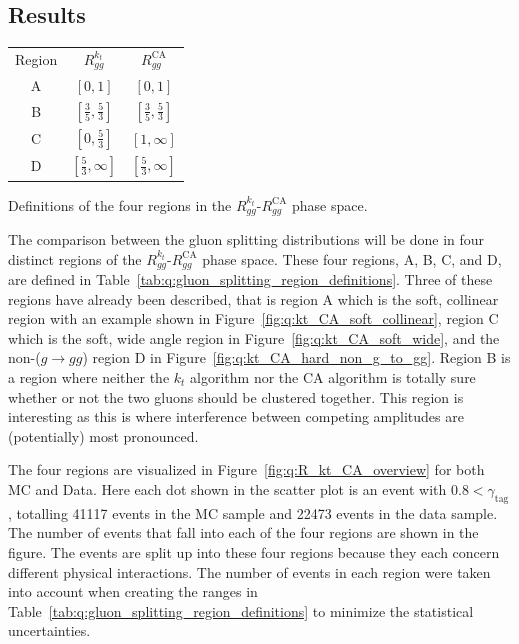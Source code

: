\subsection{Results}
\label{subsec:q:gluon_splitting_results}

\begin{margintable}[1mm]
  \centerfloat
  \begin{tabular}{@{}ccc@{}}
  Region  & $R_{gg}^{k_t}$                & $R_{gg}^\mathrm{CA}$    \\ \addlinespace[0.1em] \midrule \addlinespace[0.4em]
  A       & $[0, 1]$                      & $[0, 1]$                \\ \addlinespace[0.4em]
  B       & $[\frac{3}{5}, \frac{5}{3}]$  & $[\frac{3}{5}, \frac{5}{3}]$            \\ \addlinespace[0.4em]
  C       & $[0, \frac{5}{3}]$            & $[1, \infty]$           \\ \addlinespace[0.4em]
  D       & $[\frac{5}{3}, \infty]$       & $[\frac{5}{3}, \infty]$
  \end{tabular}
\vspace{1mm}
\caption[Rgion Definition in the $R_{gg}^{k_t}$-$R_{gg}^\mathrm{CA}$ Phase Space]{\label{tab:q:gluon_splitting_region_definitions}Definitions of the four regions in the $R_{gg}^{k_t}$-$R_{gg}^\mathrm{CA}$ phase space.}
\end{margintable}

The comparison between the gluon splitting distributions will be done in four distinct regions of the $R_{gg}^{k_t}$-$R_{gg}^\mathrm{CA}$ phase space. These four regions, A, B, C, and D, are defined in Table~\ref{tab:q:gluon_splitting_region_definitions}. Three of these regions have already been described, that is region A which is the soft, collinear region with an example shown in Figure~\ref{fig:q:kt_CA_soft_collinear}, region C which is the soft, wide angle region in Figure~\ref{fig:q:kt_CA_soft_wide}, and the non-($g\rightarrow gg$) region D in Figure~\ref{fig:q:kt_CA_hard_non_g_to_gg}. Region B is a region where neither the $k_t$ algorithm nor the CA algorithm is totally sure whether or not the two gluons should be clustered together. This region is interesting as this is where interference between competing amplitudes are (potentially) most pronounced. 

The four regions are visualized in Figure~\ref{fig:q:R_kt_CA_overview} for both MC and Data. Here each dot shown in the scatter plot is an event with $0.8 < \gamma_\mathrm{tag}$, totalling \num{41117} events in the MC sample and \num{22473} events in the data sample. The number of events that fall into each of the four regions are shown in the figure. The events are split up into these four regions because they each concern different physical interactions. The number of events in each region were taken into account when creating the ranges in Table~\ref{tab:q:gluon_splitting_region_definitions} to minimize the statistical uncertainties. 


